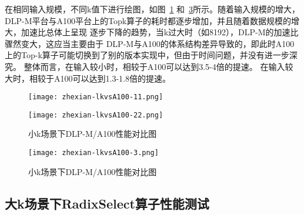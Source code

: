     在相同输入规模，不同k值下进行绘图，如图~\ref{fig:bench_littlek_vsa100_zhexian}
    和~\ref{fig:bench_littlek_vsa100_2_zhexian}所示。随着输入规模的增大，
    DLP-M平台与A100平台上的Topk算子的耗时都逐步增加，并且随着数据规模的增大，加速比总体上呈现
    逐步下降的趋势，当k过大时（如8192），DLP-M的加速比骤然变大，这应当主要由于
    DLP-M与A100的体系结构差异导致的，即此时A100上的Top-k算子可能切换到了别的版本实现中，但由于时间问题，并没有进一步深究。
    整体而言，在输入较小时，相较于A100可以达到3.5-4倍的提速。
    在输入较大时，相较于A100可以达到1.3-1.8倍的提速。

    \begin{figure}[ht]
        \centering
        \texttt{[image: zhexian-lkvsA100-11.png]}
        \label{fig:bench_littlek_vsa100_zhexian}
    \end{figure}
    
    \begin{figure}[ht]
        \centering
        \texttt{[image: zhexian-lkvsA100-22.png]}
        \caption{小k场景下DLP-M/A100性能对比图}
        \label{fig:bench_littlek_vsa100_2_zhexian_1}
    \end{figure}
    
    \begin{figure}[ht]
        \centering
        \texttt{[image: zhexian-lkvsA100-3.png]}
        \caption{小k场景下DLP-M/A100性能对比图}
        \label{fig:bench_littlek_vsa100_2_zhexian}
    \end{figure}
    

\subsection{大k场景下RadixSelect算子性能测试}

